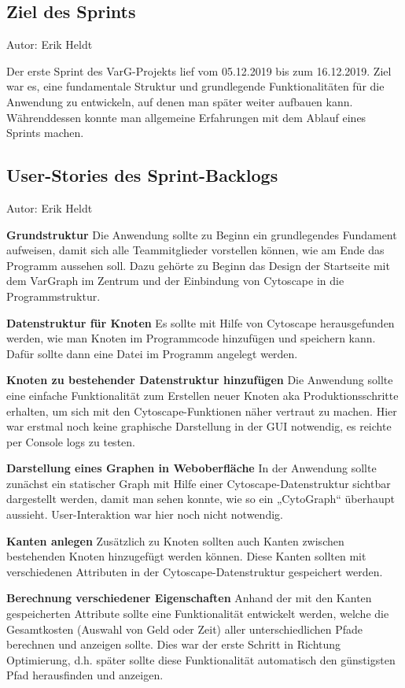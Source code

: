 \subsection{Ziel des Sprints}
{\small Autor: Erik Heldt}

Der erste Sprint des VarG-Projekts lief vom 05.12.2019 bis zum 16.12.2019. Ziel war es, eine fundamentale Struktur und grundlegende Funktionalitäten für die Anwendung zu entwickeln, auf denen man später weiter aufbauen kann. Währenddessen konnte man allgemeine Erfahrungen mit dem Ablauf eines Sprints machen.

\subsection{User-Stories des Sprint-Backlogs}
{\small Autor: Erik Heldt}

\textbf{Grundstruktur}
Die Anwendung sollte zu Beginn ein grundlegendes Fundament aufweisen, damit sich alle Teammitglieder vorstellen können, wie am Ende das Programm aussehen soll. Dazu gehörte zu Beginn das Design der Startseite mit dem VarGraph im Zentrum und der Einbindung von Cytoscape in die Programmstruktur.

\textbf{Datenstruktur für Knoten}
Es sollte mit Hilfe von Cytoscape herausgefunden werden, wie man Knoten im Programmcode hinzufügen und speichern kann. Dafür sollte dann eine Datei im Programm angelegt werden.

\textbf{Knoten zu bestehender Datenstruktur hinzufügen}
Die Anwendung sollte eine einfache Funktionalität zum Erstellen neuer Knoten aka Produktionsschritte erhalten, um sich mit den Cytoscape-Funktionen näher vertraut zu machen. Hier war erstmal noch keine graphische Darstellung in der GUI notwendig, es reichte per Console logs zu testen.

\textbf{Darstellung eines Graphen in Weboberfläche}
In der Anwendung sollte zunächst ein statischer Graph mit Hilfe einer Cytoscape-Datenstruktur sichtbar dargestellt werden, damit man sehen konnte, wie so ein „CytoGraph“ überhaupt aussieht. User-Interaktion war hier noch nicht notwendig.

\textbf{Kanten anlegen}
Zusätzlich zu Knoten sollten auch Kanten zwischen bestehenden Knoten hinzugefügt werden können. Diese Kanten sollten mit verschiedenen Attributen in der Cytoscape-Datenstruktur gespeichert werden.

\textbf{Berechnung verschiedener Eigenschaften}
Anhand der mit den Kanten gespeicherten Attribute sollte eine Funktionalität entwickelt werden, welche die Gesamtkosten (Auswahl von Geld oder Zeit) aller unterschiedlichen Pfade berechnen und anzeigen sollte. Dies war der erste Schritt in Richtung Optimierung, d.h. später sollte diese Funktionalität automatisch den günstigsten Pfad herausfinden und anzeigen.

